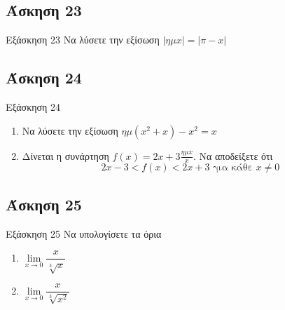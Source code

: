 \documentclass[greek]{beamer}
\begin{document}
\subsection{Άσκηση 23}
\begin{frame}[label=Άσκηση23,t]{Εξάσκηση 23}
  Να λύσετε την εξίσωση $|ημx|=|π-x|$

\end{frame}

\subsection{Άσκηση 24}
\begin{frame}[label=Άσκηση24,t]{Εξάσκηση 24}
  \begin{enumerate}
    \item Να λύσετε την εξίσωση $ημ(x^2+x)-x^2=x$ \pause
    \item Δίνεται η συνάρτηση $f(x)=2x+3\frac{ημx}{x}$. Να αποδείξετε ότι
          $$2x-3<f(x)<2x+3 \text{ για κάθε } x\ne 0$$
  \end{enumerate}

\end{frame}

\subsection{Άσκηση 25}
\begin{frame}[label=Άσκηση25,t]{Εξάσκηση 25}
  Να υπολογίσετε τα όρια
  \begin{enumerate}
    \item $\lim\limits_{x \to 0}{ \dfrac{x}{\sqrt[3]{x}} }$ \pause
    \item $\lim\limits_{x \to 0}{ \dfrac{x}{\sqrt[3]{x^2}} }$
  \end{enumerate}

\end{frame}
\end{document}
